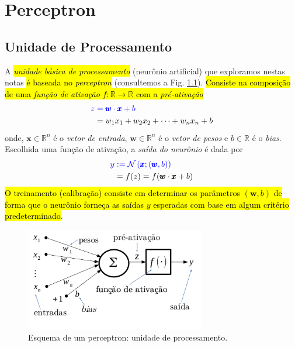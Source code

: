 
\chapter{Perceptron}\label{cap_perceptron}
\thispagestyle{fancy}


\section{Unidade de Processamento}\label{cap_perceptron_sec_unit}

A \hl{\emph{unidade básica de processamento}} (neurônio artificial) que exploramos nestas notas \hl{é baseada no \emph{perceptron}} (consultemos a Fig. \ref{fig:perceptron}). \hl{Consiste na composição de uma \emph{função de ativação} $f:\mathbb{R}\to\mathbb{R}$ com a \emph{pré-ativação}}
\begin{align}
  \color{blue}z &\color{blue}= \pmb{w}\cdot\pmb{x} + b \\
    &= w_1x_1 + w_2x_2 + \cdots + w_nx_n + b
\end{align}
onde, $\pmb{x}\in\mathbb{R}^{n}$ é o \emph{vetor de entrada}, $\pmb{w}\in\mathbb{R}^{n}$ é o \emph{vetor de pesos} e $b\in\mathbb{R}$ é o \emph{\textit{bias}}. Escolhida uma função de ativação, a \emph{saída do neurônio} é dada por
\begin{align}
  \color{blue}y &\color{blue}:= \mathcal{N}\left(\pmb{x};(\pmb{w},b)\right)\\
    &= f(z) = f(\pmb{w}\cdot\pmb{x} + b)
\end{align}
\hl{O treinamento (calibração) consiste em determinar os parâmetros $(\pmb{w}, b)$ de forma que o neurônio forneça as saídas $y$ esperadas com base em algum critério predeterminado}.

\begin{figure}[H]
  \centering
  \includegraphics[width=0.7\textwidth]{./cap_perceptron/dados/fig_perceptron/fig}
  \caption{Esquema de um perceptron: unidade de processamento.}
  \label{fig:perceptron}
\end{figure}

